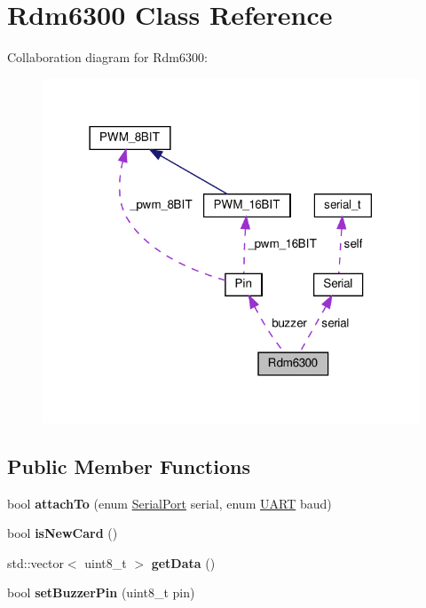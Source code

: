 \hypertarget{classRdm6300}{}\section{Rdm6300 Class Reference}
\label{classRdm6300}


Collaboration diagram for Rdm6300\+:\nopagebreak
\begin{figure}[H]
\begin{center}
\leavevmode
\includegraphics[width=318pt]{classRdm6300__coll__graph}
\end{center}
\end{figure}
\subsection*{Public Member Functions}
\begin{DoxyCompactItemize}
\item 
\mbox{\label{classRdm6300_aff170c6261d9e9364d3592dea5743671}} 
bool {\bfseries attach\+To} (enum \hyperlink{serial_8h_a3f17dbb19b0b0ea39447b731f23a33f5}{Serial\+Port} serial, enum \hyperlink{serial_8h_a6f88b8988ee3bab3eaaa301212c7f804}{U\+A\+RT} baud)
\item 
\mbox{\label{classRdm6300_a09b6928f381395bf097db97bab27639d}} 
bool {\bfseries is\+New\+Card} ()
\item 
\mbox{\label{classRdm6300_a26db1ddb2e181b75063681a930ae296a}} 
std\+::vector$<$ uint8\+\_\+t $>$ {\bfseries get\+Data} ()
\item 
\mbox{\label{classRdm6300_ae1b10584606691ff109c5395432e7ef9}} 
bool {\bfseries set\+Buzzer\+Pin} (uint8\+\_\+t pin)
\end{DoxyCompactItemize}
